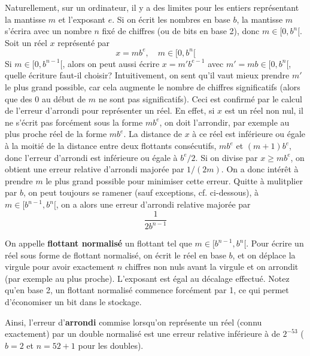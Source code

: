 \documentclass[a4paper,11pt]{book}
\begin{document}
\begin{giacjshere}
Naturellement, sur un ordinateur, il y a des limites pour les entiers  
repr\'esentant la mantisse $m$ et l'exposant $e$. 
Si on \'ecrit les nombres en base
$b$, la mantisse $m$ s'\'ecrira avec un nombre $n$ fix\'e de chiffres (ou
de bits en base 2), donc $m \in [0,b^n[$. Soit un r\'eel $x$ repr\'esent\'e
par
\[ x=mb^e, \quad m \in [0,b^n[ \]
Si $m\in [0,b^{n-1}[$, alors on peut aussi \'ecrire $x=m' b^{e-1}$ avec
$m'=mb \in [0,b^n[$, quelle \'ecriture faut-il choisir?
Intuitivement, on sent qu'il vaut mieux prendre $m'$ le plus grand
possible, car cela augmente le nombre de chiffres significatifs (alors
que des 0 au d\'ebut de $m$ ne sont pas significatifs).
Ceci est confirm\'e par le calcul de l'erreur d'arrondi pour
repr\'esenter un r\'eel. En effet, si $x$ est un r\'eel non nul, il ne
s'\'ecrit pas forc\'ement sous la forme $mb^e$, on doit l'arrondir,
par exemple au plus proche r\'eel de la forme $mb^e$. La distance
de $x$ \`a ce r\'eel est inf\'erieure ou \'egale \`a la moiti\'e
de la distance entre deux flottants cons\'ecutifs, 
$mb^e$ et $(m+1)b^e$, donc l'erreur d'arrondi
est inf\'erieure ou \'egale \`a $b^e/2$. Si on divise par $x \geq mb^e$,
on obtient une erreur relative d'arrondi major\'ee par $1/(2m)$.
On a donc int\'er\^et \`a prendre $m$ le plus grand possible pour
minimiser cette erreur. Quitte \`a mulitplier par $b$, on peut
toujours se ramener (sauf exceptions, cf. ci-dessous), 
\`a $m \in [b^{n-1},b^n[$, on a alors
une erreur d'arrondi relative major\'ee par
\[ \frac{1}{2b^{n-1}}\]

On appelle {\bf flottant normalis\'e} un flottant tel que $m \in
[b^{n-1},b^n[$. Pour \'ecrire un r\'eel sous forme de flottant
normalis\'e, on \'ecrit le r\'eel en base $b$, et on d\'eplace
la virgule pour avoir exactement $n$ chiffres non nuls avant la
virgule et on arrondit (par exemple au plus proche). 
L'exposant est \'egal au d\'ecalage effectu\'e.
Notez qu'en base 2, un flottant normalisé commence forcément
par 1, ce qui permet d'économiser un bit dans le stockage.

Ainsi, l'erreur d'{\bf arrondi} commise lorsqu'on
représente un réel (connu exactement) par un double normalis\'e 
est une erreur relative inf\'erieure \`a
de $2^{-53}$ ($b=2$ et $n=52+1$ pour les doubles).


\end{giacjshere}
\end{document}
